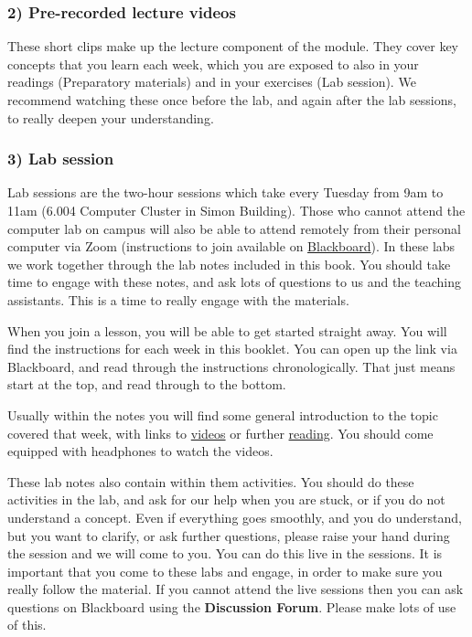 \documentclass[
]{book}
\begin{document}
\hypertarget{pre-recorded-lecture-videos}{%
\subsubsection*{2) Pre-recorded lecture videos}\label{pre-recorded-lecture-videos}}

These short clips make up the lecture component of the module. They cover key concepts that you learn each week, which you are exposed to also in your readings (Preparatory materials) and in your exercises (Lab session). We recommend watching these once before the lab, and again after the lab sessions, to really deepen your understanding.

\hypertarget{lab-session}{%
\subsubsection*{3) Lab session}\label{lab-session}}

Lab sessions are the two-hour sessions which take every Tuesday from 9am to 11am (6.004 Computer Cluster in Simon Building). Those who cannot attend the computer lab on campus will also be able to attend remotely from their personal computer via Zoom (instructions to join available on \href{https://online.manchester.ac.uk/webapps/blackboard/content/listContentEditable.jsp?content_id=_12745591_1\&course_id=_67464_1}{Blackboard}). In these labs we work together through the lab notes included in this book. You should take time to engage with these notes, and ask lots of questions to us and the teaching assistants. This is a time to really engage with the materials.

When you join a lesson, you will be able to get started straight away. You will find the instructions for each week in this booklet. You can open up the link via Blackboard, and read through the instructions chronologically. That just means start at the top, and read through to the bottom.

Usually within the notes you will find some general introduction to the topic covered that week, with links to \href{http://www.gapminder.org/videos/the-joy-of-stats/}{videos} or further \href{http://flowingdata.com/2015/10/26/top-brewery-road-trip-routed-algorithmically/}{reading}. You should come equipped with headphones to watch the videos.

These lab notes also contain within them activities. You should do these activities in the lab, and ask for our help when you are stuck, or if you do not understand a concept. Even if everything goes smoothly, and you do understand, but you want to clarify, or ask further questions, please raise your hand during the session and we will come to you. You can do this live in the sessions. It is important that you come to these labs and engage, in order to make sure you really follow the material. If you cannot attend the live sessions then you can ask questions on Blackboard using the \textbf{Discussion Forum}. Please make lots of use of this.
\end{document}
